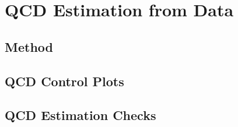 \section{QCD Estimation from Data}
\label{sec:qcdControl}

\subsection{Method}
\label{ssec:qcdEstimation}
\subsection{QCD Control Plots}
\label{ssec:qcdControlPlots}
\subsection{QCD Estimation Checks}
\label{ssec:qcdChecks}